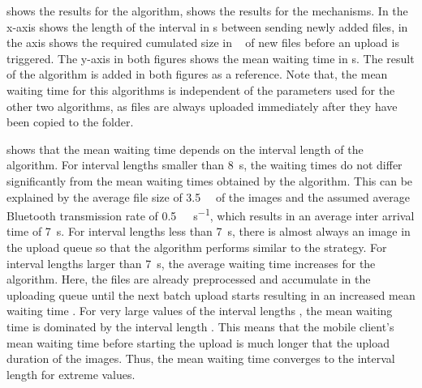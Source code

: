  shows the results for the \algointerval algorithm,  shows the results for the \algosize mechanisms.
In  the x-axis shows the length of the interval \thresholdInterval in \si{\second} between sending newly added files, in  the axis shows the required cumulated size in \si{\mega\byte} of new files before an upload is triggered.
The y-axis in both figures shows the mean waiting time \sojournTime in \si{\second}.
The result of the \algoimmediate algorithm is added in both figures as a reference.
Note that, the mean waiting time \sojournTime for this algorithms is independent of the parameters used for the other two algorithms, as files are always uploaded immediately after they have been copied to the \dropbox folder.

 shows that the mean waiting time \sojournTime depends on the interval length \thresholdInterval of the \algointerval algorithm.
For interval lengths \thresholdInterval smaller than \SI{8}{\second}, the waiting times do not differ significantly from the mean waiting times \sojournTime obtained by the \algoimmediate algorithm.
This can be explained by the average file size of \SI{3.5}{\mega\byte} of the images and the assumed average Bluetooth transmission rate of \SI{0.5}{\mega\bit\per\second}, which results in an average inter arrival time of \SI{7}{\second}.
For interval lengths \thresholdInterval less than \SI{7}{\second}, there is almost always an image in the upload queue so that the algorithm performs similar to the \algoimmediate strategy.
For interval lengths \thresholdInterval larger than \SI{7}{\second}, the average waiting time increases for the \algointerval algorithm.
Here, the files are already preprocessed and accumulate in the uploading queue until the next batch upload starts resulting in an increased mean waiting time \sojournTime.
For very large values of the interval lengths \thresholdInterval, the mean waiting time \sojournTime is dominated by the interval length \thresholdInterval.
This means that the mobile client's mean waiting time \sojournTime before starting the upload is much longer that the upload duration of the images.
Thus, the mean waiting time \sojournTime converges to the interval length \thresholdInterval for extreme values.

